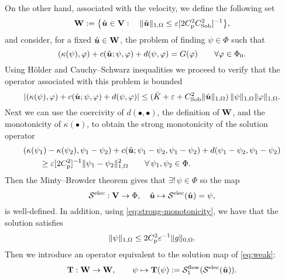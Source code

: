 On the other hand, associated with the velocity, we define the following set
\begin{equation}\label{eq:def-W-u}
 \mathbf{W} := \bigl\{\hat{\boldsymbol{u}} \in \mathbf{V}:\quad  \|\hat{\boldsymbol{u}}\|_{1,\Omega} \leq {\varepsilon}[{2 C_{\mathrm{p}}^2 C_{\mathrm{Sob}}^2}]^{-1} \bigr\}, 
\end{equation}
and consider, for a fixed $\hat{\boldsymbol{u}}\in \mathbf{W}$, the problem of finding $\psi \in \Phi$ such that 
\begin{equation}\label{eq:Boltzmann}
(\kappa(\psi),\varphi) + c(\hat{\boldsymbol{u}}; \psi, \varphi) + d(\psi,\varphi)  = G(\varphi) \qquad  \forall \varphi \in \Phi_0.
\end{equation}
Using H\"older and Cauchy--Schwarz inequalities we proceed to verify that the operator associated with this problem is bounded 
\[|(\kappa(\psi),\varphi) + c(\hat{\boldsymbol{u}}; \psi, \varphi) + d(\psi,\varphi)| \leq (\bar{K} + \varepsilon + C_{\mathrm{Sob}}^2\|\hat{\boldsymbol{u}}\|_{1,\Omega} )\,  \|\psi\|_{1,\Omega}\|\varphi\|_{1,\Omega}.\]
Next we can use the coercivity of $d(\bullet,\bullet)$, the definition of $\mathbf{W}$, and the monotonicity of   $\kappa(\bullet)$, to obtain the strong monotonicity  of the solution operator
\begin{align}\label{eq:strong-monotonicity}
\nonumber
&(\kappa(\psi_1) - \kappa(\psi_2), \psi_1-\psi_2)+ c(\hat{\boldsymbol{u}}; \psi_1-\psi_2,\psi_1-\psi_2)+ d(\psi_1-\psi_2,\psi_1-\psi_2)\\
&\qquad
 \geq {\varepsilon}[{2 C_{\mathrm{p}}^2}]^{-1} \|\psi_1-\psi_2\|^2_{1,\Omega} \qquad \forall\,\psi_1,\psi_2\in \Phi.
\end{align}
Then the Minty--Browder theorem gives that 
$\exists !\, \psi \in \Phi$ so the map 
\[\mathcal{S}^{\mathrm{elec}}: \mathbf{V} \to \Phi, \quad \hat{\boldsymbol{u}} \mapsto \mathcal{S}^{\mathrm{elec}}(\hat{\boldsymbol{u}}) = \psi,\]
is well-defined. In addition, using  \eqref{eq:strong-monotonicity}, we have that the solution satisfies 
\begin{equation}\label{eq:stab-psi}
\|\psi\|_{1,\Omega} \leq {2C_{\mathrm{p}}^2}{\varepsilon}^{-1}\|g\|_{0,\Omega}.
\end{equation}
Then we introduce an operator equivalent to the solution map of \eqref{eq:weak}: 
\begin{equation}\label{eq:def-T}
\mathbf{T}: \mathbf{W} \to \mathbf{W}, \qquad \psi \mapsto \mathbf{T}(\psi) := \mathcal{S}^{\mathrm{flow}}_1(\mathcal{S}^{\mathrm{elec}}(\hat{\boldsymbol{u}})).
\end{equation}

